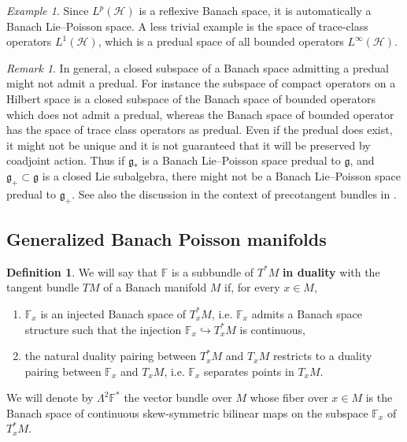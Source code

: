 \documentclass[a4paper,12pt,reqno]{amsart}%
\theoremstyle{definition}
\newtheorem{definition}[theorem]{Definition}
\theoremstyle{remark}
\newtheorem{remark}[theorem]{Remark}
\newtheorem{example}[theorem]{Example}
\numberwithin{theorem}{section}
\numberwithin{equation}{section}
\newcommand{\1}{{\bf 1}}
\newcommand{\g}{{\mathfrak g}}
\begin{document}
\begin{example}\label{exLp}
    Since $L^p(\mathcal{H})$ is a reflexive Banach space, it is automatically a Banach Lie--Poisson space. A less trivial example is the space of trace-class operators $L^1(\mathcal{H})$, which is a predual space of all bounded operators $L^\infty(\mathcal{H})$.
\end{example}

\begin{remark}\label{existence_predual}
    In general, a closed subspace of a Banach space admitting a predual might not admit a predual. For instance the subspace of compact operators on a Hilbert space is a closed subspace of the Banach space of bounded operators which does not admit a predual, whereas the Banach space of bounded operator has the space of trace class operators as predual. Even if the predual does exist, it might not be unique and it is not guaranteed that it will be preserved by coadjoint action. Thus if $\g_*$ is a Banach Lie--Poisson space predual to $\g$, and $\g_+\subset \g$ is a closed Lie subalgebra, there might not be a Banach Lie--Poisson space predual to $\g_+$. See also the discussion in the context of precotangent bundles in \cite{G-precot}.
\end{remark}



\subsection{Generalized Banach Poisson manifolds}\label{sec:generalisation_poisson}
\begin{definition}\label{subbundleduality} 
We will say that $\mathbb{F}$ is a subbundle  of $T^*M$ \textbf{in duality} with the tangent bundle $TM$ of a Banach manifold  $M$ if, for every $x\in M$, 
\begin{enumerate}
\item $\mathbb{F}_x$ is an injected Banach space of $T_x^*M$, i.e. $\mathbb{F}_x$ admits a Banach space structure such that the injection $\mathbb{F}_x\hookrightarrow T_x^*M$ is continuous,
\item the natural duality pairing between $T_x^*M$ and $T_xM$ restricts to a duality pairing between $\mathbb{F}_x$ and $T_xM$, i.e.  $\mathbb{F}_x$ separates points in $T_xM$.
\end{enumerate}

\end{definition}

We will denote by $\Lambda^2\mathbb{F}^{*}$ the vector bundle over $M$ whose fiber over $x\in M$ is the Banach space of continuous skew-symmetric bilinear maps on the subspace $\mathbb{F}_x$ of $T_x^*M$.
\end{document}
